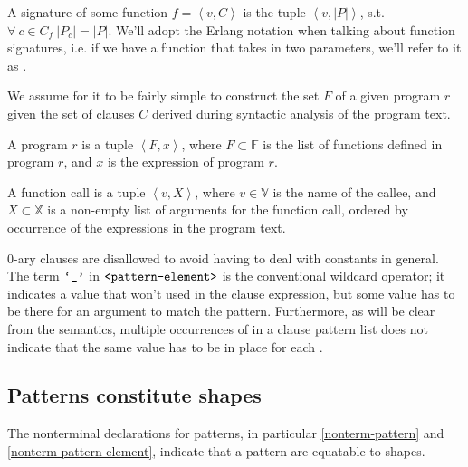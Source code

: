 \begin{definition} A signature of some function $f=\left\langle v, C
\right\rangle$ is the tuple $\left\langle v,|P| \right\rangle$, s.t.
$\forall\ c\in C_f\ |P_c|=|P|$. We'll adopt the Erlang notation when talking
about function signatures, i.e. if we have a function  that takes in
two parameters, we'll refer to it as .\end{definition}

We assume for it to be fairly simple to construct the set $F$ of a given
program $r$ given the set of clauses $C$ derived during syntactic analysis of
the program text.

\begin{definition} A program $r$ is a tuple $\left\langle F,x \right\rangle$,
where $F\subset\mathbb{F}$ is the list of functions defined in program $r$, and
$x$ is the expression of program $r$.\end{definition}

\begin{definition}\label{definition:function-call} A function call is a tuple
$\left\langle v, X \right\rangle$, where $v\in\mathbb{V}$ is the name of the
callee, and $X\subset\mathbb{X}$ is a non-empty list of arguments for the
function call, ordered by occurrence of the expressions in the program
text.\end{definition}

0-ary clauses are disallowed to avoid having to deal with constants in general.
The term $\text{{\ttfamily`\_'}}$ in $\text{{\ttfamily<pattern-element>}}$ is the conventional
wildcard operator; it indicates a value that won't used in the clause
expression, but some value has to be there for an argument to match the
pattern. Furthermore, as will be clear from the semantics, multiple occurrences
of \term{\_} in a clause pattern list does not indicate that the same value has
to be in place for each \term{\_}. 



\subsection{Patterns constitute shapes}

The nonterminal declarations for patterns, in particular \ref{nonterm-pattern}
and \ref{nonterm-pattern-element}, indicate that a pattern are equatable to
shapes.

